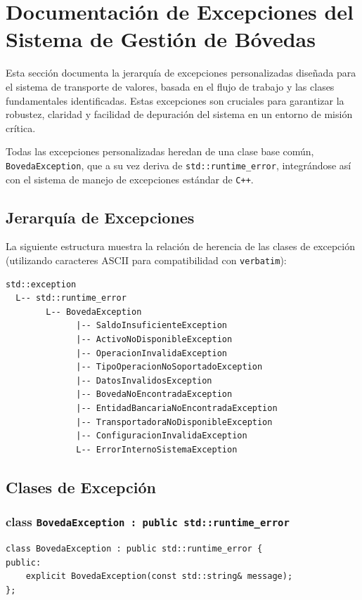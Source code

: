 \documentclass{article}
\newcommand{\inlinecode}[1]{\texttt{#1}}
\begin{document}
\section*{Documentación de Excepciones del Sistema de Gestión de Bóvedas}

Esta sección documenta la jerarquía de excepciones personalizadas diseñada para el sistema de transporte de valores, basada en el flujo de trabajo y las clases fundamentales identificadas. Estas excepciones son cruciales para garantizar la robustez, claridad y facilidad de depuración del sistema en un entorno de misión crítica.

Todas las excepciones personalizadas heredan de una clase base común, \inlinecode{BovedaException}, que a su vez deriva de \inlinecode{std::runtime_error}, integrándose así con el sistema de manejo de excepciones estándar de \inlinecode{C++}.

\subsection*{Jerarquía de Excepciones}

La siguiente estructura muestra la relación de herencia de las clases de excepción (utilizando caracteres ASCII para compatibilidad con \inlinecode{verbatim}):
\begin{verbatim}
std::exception
  L-- std::runtime_error
        L-- BovedaException
              |-- SaldoInsuficienteException
              |-- ActivoNoDisponibleException
              |-- OperacionInvalidaException
              |-- TipoOperacionNoSoportadoException
              |-- DatosInvalidosException
              |-- BovedaNoEncontradaException
              |-- EntidadBancariaNoEncontradaException
              |-- TransportadoraNoDisponibleException
              |-- ConfiguracionInvalidaException
              L-- ErrorInternoSistemaException
\end{verbatim}

\subsection*{Clases de Excepción}

\subsubsection*{class \inlinecode{BovedaException : public std::runtime_error}}
\vspace{2mm} %
\begin{lstlisting}
class BovedaException : public std::runtime_error {
public:
    explicit BovedaException(const std::string& message);
};
\end{lstlisting}
\end{document}
